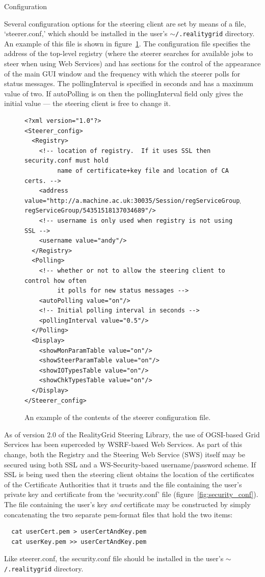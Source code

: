 \documentclass[a4paper,twoside]{article}
\begin{document}
\begin{section}{Configuration}
\label{sec:config}

Several configuration options for the steering client are set by means
of a file, `steerer.conf,' which should be installed in the user's
\texttt{$\sim$/.realitygrid} directory. An example of this file is
shown in figure~\ref{fig:steerer_conf}.  The configuration file
specifies the address of the top-level registry (where the steerer
searches for available jobs to steer when using Web Services) and has
sections for the control of the appearance of the main GUI window and
the frequency with which the steerer polls for status messages.  The
pollingInterval is specified in seconds and has a maximum value of
two. If autoPolling is on then the pollingInterval field only gives
the initial value --- the steering client is free to change it.

\begin{figure}
\begin{verbatim}<?xml version="1.0"?>
<Steerer_config>
  <Registry>
    <!-- location of registry.  If it uses SSL then security.conf must hold
         name of certificate+key file and location of CA certs. -->
    <address value="http://a.machine.ac.uk:30035/Session/regServiceGroup/
regServiceGroup/54351518137034689"/>
    <!-- username is only used when registry is not using SSL -->
    <username value="andy"/>
  </Registry>
  <Polling>
    <!-- whether or not to allow the steering client to control how often
         it polls for new status messages -->
    <autoPolling value="on"/>
    <!-- Initial polling interval in seconds -->
    <pollingInterval value="0.5"/>
  </Polling>
  <Display>
    <showMonParamTable value="on"/>
    <showSteerParamTable value="on"/>
    <showIOTypesTable value="on"/>
    <showChkTypesTable value="on"/>
  </Display>
</Steerer_config>
\end{verbatim}
\caption{An example of the contents of the steerer configuration file.}
\label{fig:steerer_conf}
\end{figure}

As of version 2.0 of the RealityGrid Steering Library, the use of
OGSI-based Grid Services has been superceded by WSRF-based Web
Services.  As part of this change, both the Registry and the Steering
Web Service (SWS) itself may be secured using both SSL and a
WS-Security-based username/password scheme. If SSL is being used then
the steering client obtains the location of the certificates of the
Certificate Authorities that it trusts and the file containing the
user's private key and certificate from the `security.conf' file
(figure~\ref{fig:security_conf}). The file containing the user's key
{\em and} certificate may be constructed by simply concatenating the
two separate pem-format files that hold the two items: 
\begin{verbatim}
  cat userCert.pem > userCertAndKey.pem
  cat userKey.pem >> userCertAndKey.pem
\end{verbatim}
Like steerer.conf, the security.conf file should be installed in the user's
\texttt{$\sim$/.realitygrid} directory.


\end{section}
\end{document}
